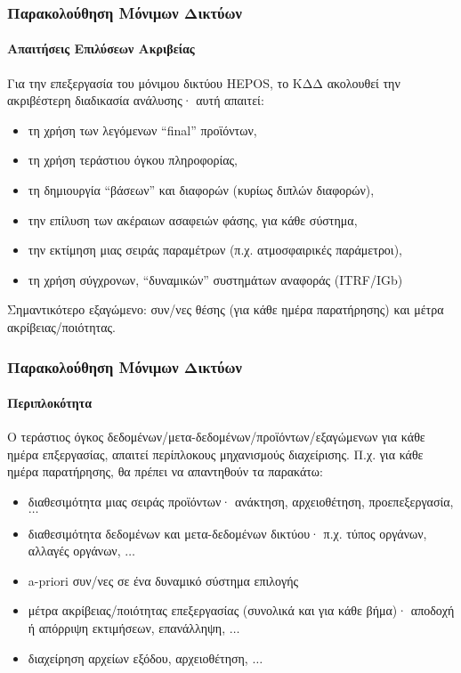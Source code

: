 \begin{frame}
  \frametitle{Παρακολούθηση Μόνιμων Δικτύων}
  \framesubtitle{Απαιτήσεις Επιλύσεων Ακριβείας}
  \label{}

    Για την επεξεργασία του μόνιμου δικτύου HEPOS, το ΚΔΔ ακολουθεί την ακριβέστερη διαδικασία
    ανάλυσης· αυτή απαιτεί:
    \begin{itemize}
        \item τη χρήση των λεγόμενων ``final'' προϊόντων,
        \item τη χρήση τεράστιου όγκου πληροφορίας,
        \item τη δημιουργία ``βάσεων'' και διαφορών (κυρίως διπλών διαφορών),
        \item την επίλυση των ακέραιων ασαφειών φάσης, για κάθε σύστημα,
        \item την εκτίμηση μιας σειράς παραμέτρων (π.χ. ατμοσφαιρικές παράμετροι),
        \item τη χρήση σύγχρονων, ``δυναμικών'' συστημάτων αναφοράς (ITRF/IGb)
    \end{itemize}
    \vspace{0.3cm}

    Σημαντικότερο εξαγώμενο: συν/νες θέσης (για κάθε ημέρα παρατήρησης) και μέτρα ακρίβειας/ποιότητας.
\end{frame}
\note{}

\begin{frame}
  \frametitle{Παρακολούθηση Μόνιμων Δικτύων}
  \framesubtitle{Περιπλοκότητα}
  \label{}

    Ο τεράστιος όγκος δεδομένων/μετα-δεδομένων/προϊόντων/εξαγώμενων για κάθε ημέρα επξεργασίας,
    απαιτεί περίπλοκους μηχανισμούς διαχείρισης. Π.χ. για κάθε ημέρα παρατήρησης, θα πρέπει να
    απαντηθούν τα παρακάτω:
    \begin{itemize}
        \item διαθεσιμότητα μιας σειράς προϊόντων· ανάκτηση, αρχειοθέτηση, προεπεξεργασία, $\ldots$
        \item διαθεσιμότητα δεδομένων και μετα-δεδομένων δικτύου· π.χ. τύπος οργάνων, αλλαγές οργάνων, $\ldots$
        \item a-priori συν/νες σε ένα δυναμικό σύστημα επιλογής
        \item μέτρα ακρίβειας/ποιότητας επεξεργασίας (συνολικά και για κάθε βήμα)· αποδοχή ή απόρριψη εκτιμήσεων, επανάλληψη, $\ldots$
        \item διαχείρηση αρχείων εξόδου, αρχειοθέτηση, $\ldots$
    \end{itemize}
\end{frame}
\note{}

